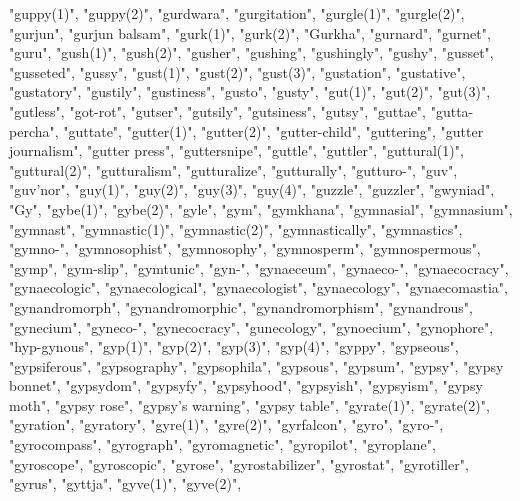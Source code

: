 "guppy(1)",
"guppy(2)",
"gurdwara",
"gurgitation",
"gurgle(1)",
"gurgle(2)",
"gurjun",
"gurjun balsam",
"gurk(1)",
"gurk(2)",
"Gurkha",
"gurnard",
"gurnet",
"guru",
"gush(1)",
"gush(2)",
"gusher",
"gushing",
"gushingly",
"gushy",
"gusset",
"gusseted",
"gussy",
"gust(1)",
"gust(2)",
"gust(3)",
"gustation",
"gustative",
"gustatory",
"gustily",
"gustiness",
"gusto",
"gusty",
"gut(1)",
"gut(2)",
"gut(3)",
"gutless",
"got-rot",
"gutser",
"gutsily",
"gutsiness",
"gutsy",
"guttae",
"gutta-percha",
"guttate",
"gutter(1)",
"gutter(2)",
"gutter-child",
"guttering",
"gutter journalism",
"gutter press",
"guttersnipe",
"guttle",
"guttler",
"guttural(1)",
"guttural(2)",
"gutturalism",
"gutturalize",
"gutturally",
"gutturo-",
"guv",
"guv'nor",
"guy(1)",
"guy(2)",
"guy(3)",
"guy(4)",
"guzzle",
"guzzler",
"gwyniad",
"Gy",
"gybe(1)",
"gybe(2)",
"gyle",
"gym",
"gymkhana",
"gymnasial",
"gymnasium",
"gymnast",
"gymnastic(1)",
"gymnastic(2)",
"gymnastically",
"gymnastics",
"gymno-",
"gymnosophist",
"gymnosophy",
"gymnosperm",
"gymnospermous",
"gymp",
"gym-slip",
"gymtunic",
"gyn-",
"gynaeceum",
"gynaeco-",
"gynaecocracy",
"gynaecologic",
"gynaecological",
"gynaecologist",
"gynaecology",
"gynaecomastia",
"gynandromorph",
"gynandromorphic",
"gynandromorphism",
"gynandrous",
"gynecium",
"gyneco-",
"gynecocracy",
"gunecology",
"gynoecium",
"gynophore",
"hyp-gynous",
"gyp(1)",
"gyp(2)",
"gyp(3)",
"gyp(4)",
"gyppy",
"gypseous",
"gypsiferous",
"gypsography",
"gypsophila",
"gypsous",
"gypsum",
"gypsy",
"gypsy bonnet",
"gypsydom",
"gypsyfy",
"gypsyhood",
"gypsyish",
"gypsyism",
"gypsy moth",
"gypsy rose",
"gypsy's warning",
"gypsy table",
"gyrate(1)",
"gyrate(2)",
"gyration",
"gyratory",
"gyre(1)",
"gyre(2)",
"gyrfalcon",
"gyro",
"gyro-",
"gyrocompass",
"gyrograph",
"gyromagnetic",
"gyropilot",
"gyroplane",
"gyroscope",
"gyroscopic",
"gyrose",
"gyrostabilizer",
"gyrostat",
"gyrotiller",
"gyrus",
"gyttja",
"gyve(1)",
"gyve(2)",
